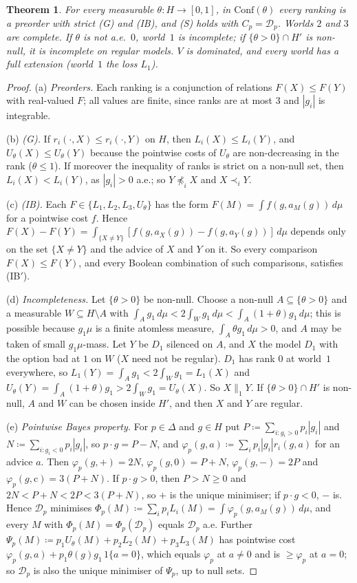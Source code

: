\documentclass[11pt]{article}
\newtheorem{theorem}{Theorem}
\theoremstyle{definition}\newtheorem{definition}[theorem]{Definition}
\theoremstyle{remark}\newtheorem{remark}[theorem]{Remark}
\newcommand{\Dscr}{\mathcal D}
\begin{document}
\begin{theorem}\label{thm:conf}
For every measurable $\theta\colon H\to[0,1]$, in $\mathrm{Conf}(\theta)$
every ranking is a preorder with strict (G) and (IB), and (S) holds with
$C_p=\Dscr_p$. Worlds $2$ and $3$ are complete. If $\theta$ is not a.e.\
$0$, world~$1$ is incomplete; if $\{\theta>0\}\cap H'$ is non-null, it is
incomplete on regular models. $V$ is dominated, and every world has a full
extension (world~$1$ the loss $L_1$).
\end{theorem}
\begin{proof}
(a) \emph{Preorders.} Each ranking is a conjunction of relations
$F(X)\le F(Y)$ with real-valued $F$; all values are finite, since ranks are
at most $3$ and $|g_i|$ is integrable.

(b) \emph{(G).} If $r_i(\cdot,X)\le r_i(\cdot,Y)$ on $H$, then
$L_i(X)\le L_i(Y)$, and $U_\theta(X)\le U_\theta(Y)$ because the pointwise
costs of $U_\theta$ are non-decreasing in the rank ($\theta\le1$). If
moreover the inequality of ranks is strict on a non-null set, then
$L_i(X)<L_i(Y)$, as $|g_i|>0$ a.e.; so $Y\not\preceq_iX$ and $X\prec_iY$.

(c) \emph{(IB).} Each $F\in\{L_1,L_2,L_3,U_\theta\}$ has the form
$F(M)=\int f(g,a_M(g))\,d\mu$ for a pointwise cost $f$. Hence
$F(X)-F(Y)=\int_{\{X\ne Y\}}[f(g,a_X(g))-f(g,a_Y(g))]\,d\mu$ depends only on
the set $\{X\ne Y\}$ and the advice of $X$ and $Y$ on it. So every
comparison $F(X)\le F(Y)$, and every Boolean combination of such
comparisons, satisfies (IB$'$).

(d) \emph{Incompleteness.} Let $\{\theta>0\}$ be non-null. Choose a non-null
$A\subseteq\{\theta>0\}$ and a measurable $W\subseteq H\setminus A$ with
$\int_Ag_1\,d\mu<2\int_Wg_1\,d\mu<\int_A(1+\theta)g_1\,d\mu$; this is
possible because $g_1\mu$ is a finite atomless measure, $\int_A\theta
g_1\,d\mu>0$, and $A$ may be taken of small $g_1\mu$-mass. Let $Y$ be $D_1$
silenced on $A$, and $X$ the model $D_1$ with the option bad at $1$ on $W$
($X$ need not be regular). $D_1$ has rank $0$ at world~$1$ everywhere, so
$L_1(Y)=\int_Ag_1<2\int_Wg_1=L_1(X)$ and
$U_\theta(Y)=\int_A(1+\theta)g_1>2\int_Wg_1=U_\theta(X)$. So
$X\parallel_1Y$. If $\{\theta>0\}\cap H'$ is non-null, $A$ and $W$ can be
chosen inside $H'$, and then $X$ and $Y$ are regular.

(e) \emph{Pointwise Bayes property.} For $p\in\Delta$ and $g\in H$ put
$P\coloneqq\sum_{i:g_i>0}p_i|g_i|$ and $N\coloneqq\sum_{i:g_i<0}p_i|g_i|$, so
$p\cdot g=P-N$, and $\varphi_p(g,a)\coloneqq\sum_ip_i|g_i|r_i(g,a)$ for an
advice $a$. Then $\varphi_p(g,+)=2N$, $\varphi_p(g,0)=P+N$,
$\varphi_p(g,-)=2P$ and $\varphi_p(g,\mathrm c)=3(P+N)$. If $p\cdot g>0$,
then $P>N\ge0$ and $2N<P+N<2P<3(P+N)$, so $+$ is the unique minimiser; if
$p\cdot g<0$, $-$ is. Hence $\Dscr_p$ minimises
$\Phi_p(M)\coloneqq\sum_ip_iL_i(M)=\int\varphi_p(g,a_M(g))\,d\mu$, and every
$M$ with $\Phi_p(M)=\Phi_p(\Dscr_p)$ equals $\Dscr_p$ a.e. Further
$\Psi_p(M)\coloneqq p_1U_\theta(M)+p_2L_2(M)+p_3L_3(M)$ has pointwise cost
$\varphi_p(g,a)+p_1\theta(g)g_1\,1\{a=0\}$, which equals $\varphi_p$ at
$a\ne0$ and is $\ge\varphi_p$ at $a=0$; so $\Dscr_p$ is also the unique
minimiser of $\Psi_p$, up to null sets.


\end{proof}
\end{document}
